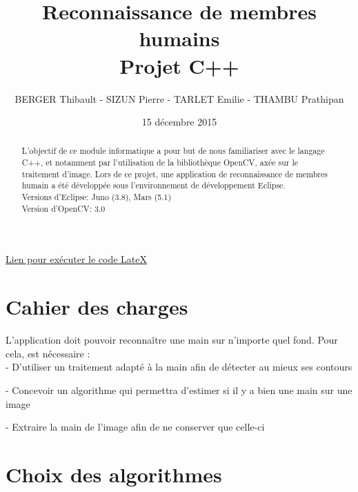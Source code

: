 \documentclass[10pt,a4paper]{report}
\begin{document}
\title{Reconnaissance de membres humains\\
Projet C++}
\author{BERGER Thibault - SIZUN Pierre - TARLET Emilie - THAMBU Prathipan}
\date{15 d\'ecembre 2015}
\href{https://www.overleaf.com/3918882mrfmjh#/11323738/}{Lien pour exécuter le code LateX}
\maketitle

\begin{abstract}
L'objectif de ce module informatique a pour but de nous familiariser avec le langage C++, et notamment par l'utilisation de la bibliothèque OpenCV, axée sur le traitement d'image.
Lors de ce projet, une application de reconnaissance de membres humain a été développée sous l'environnement de développement Eclipse.\\
\newline
Versions d'Eclipse: Juno (3.8), Mars (5.1)\\
Version d'OpenCV: 3.0
\end{abstract}

\tableofcontents
\newpage


\section{Cahier des charges}

L'application doit pouvoir reconnaître une main sur n’importe quel fond.  Pour cela, est nécessaire :\\

	- D'utiliser un traitement adapté à la main afin de détecter au mieux ses contours
	
	- Concevoir un algorithme qui permettra d’estimer si il y a bien une main sur une image 
	
	- Extraire la main de l’image afin de ne conserver que celle-ci


\section{Choix des algorithmes}
\end{document}

